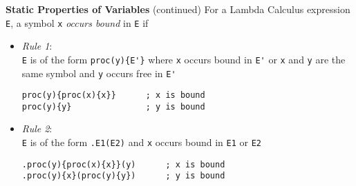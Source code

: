 \begin{minipage}[t]{\sw}
\slidenumber
\LARGE
{\bf Static Properties of Variables} (continued)\exx
\emm{\Large\LightBox{\MYlambda}}\exx
For a Lambda Calculus expression \verb'E', a symbol \verb'x'
{\em occurs bound} in \verb'E' if
\begin{itemize}
\item   {\em Rule 1}:\\
	\verb'E' is of the form \verb:proc(y){E'}:
	where \verb'x' occurs bound in \verb:E':
        or \verb'x' and \verb'y' are the same symbol
	and \verb'y' occurs free in \verb:E':

	\emm\verb'proc(y){proc(x){x}}      ; x is bound'\\
	\emm\verb'proc(y){y}               ; y is bound'\\

\item   {\em Rule 2}:\\
	\verb'E' is of the form \verb'.E1(E2)'
	and \verb'x' occurs bound in \verb'E1' or \verb'E2'

	\emm\verb'.proc(y){proc(x){x}}(y)      ; x is bound'\\
	\emm\verb'.proc(y){x}(proc(y){y})      ; y is bound'\\
\end{itemize}
\end{minipage}
\clearpage
